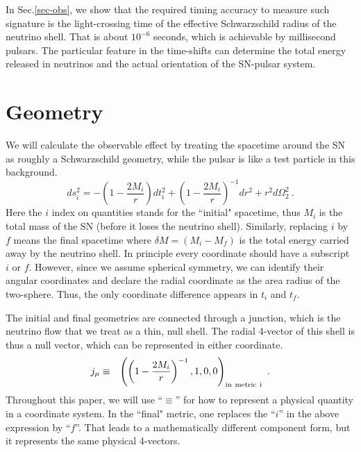 \documentclass[aps,showpacs,onecolumn,floats,prd,superscriptaddress,nofootinbib]{revtex4}
\begin{document}
In Sec.\ref{sec-obs}, we show that the required timing accuracy to measure such signature is the light-crossing time of the effective Schwarzschild radius of the neutrino shell. That is about $10^{-6}$ seconds, which is achievable by millisecond pulsars. The particular feature in the time-shifts can determine the total energy released in neutrinos and the actual orientation of the SN-pulsar system.

\section{Geometry}
\label{sec-JC}

We will calculate the observable effect by treating the spacetime around the SN as roughly a Schwarzschild geometry, while the pulsar is like a test particle in this background.
\begin{equation}
	ds_i^2 = -\left( 1 -\frac{2M_i}{r}\right) dt_i^2 + \left( 1 -\frac{2M_i}{r} \right)^{-1} dr^2 + r^2 d \Omega_2^2~.	\label{2.1}
\end{equation}
Here the $i$ index on quantities stands for the ``initial" spacetime, thus $M_i$ is the total mass of the SN (before it loses the neutrino shell). Similarly, replacing $i$ by $f$ means the final spacetime where $\delta M = (M_i-M_f)$ is the total energy carried away by the neutrino shell. In principle every coordinate should have a subscript $i$ or $f$. However, since we assume spherical symmetry, we can identify their angular coordinates and declare the radial coordinate as the area radius of the two-sphere. Thus, the only coordinate difference appears in $t_i$ and $t_f$. 

The initial and final geometries are connected through a junction, which is the neutrino flow that we treat as a thin, null shell. The radial 4-vector of this shell is thus a null vector, which can be represented in either coordinate.
\begin{eqnarray}
j_\mu &\equiv& \left( \left(1-\frac{2M_i}{r}\right)^{-1} ,  1 , 0 , 0 \right)_{\rm in \ metric \ i}~.
\end{eqnarray}
Throughout this paper, we will use ``$\equiv$'' for how to represent a physical quantity in a coordinate system. In the ``final" metric, one replaces the ``$i$'' in the above expression by ``$f$''. That leads to a mathematically different component form, but it represents the same physical 4-vectors.
\end{document}
